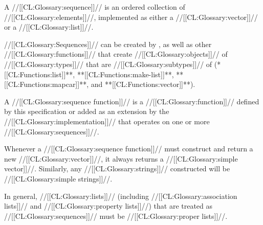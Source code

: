 

A //[[CL:Glossary:sequence]]// is an ordered collection of //[[CL:Glossary:elements]]//,
implemented as either a //[[CL:Glossary:vector]]// or a //[[CL:Glossary:list]]//.

//[[CL:Glossary:Sequences]]// can be created by ,
as well as other //[[CL:Glossary:functions]]// that create //[[CL:Glossary:objects]]// 
of //[[CL:Glossary:types]]// that are //[[CL:Glossary:subtypes]]// of  
(\eg **[[CL:Functions:list]]**, **[[CL:Functions:make-list]]**, **[[CL:Functions:mapcar]]**, and **[[CL:Functions:vector]]**).

A //[[CL:Glossary:sequence function]]// is a //[[CL:Glossary:function]]// 
   defined by this specification
or added as an extension by the //[[CL:Glossary:implementation]]// 
that operates on one or more //[[CL:Glossary:sequences]]//.

Whenever a //[[CL:Glossary:sequence function]]// must construct and return
a new //[[CL:Glossary:vector]]//, it always returns a //[[CL:Glossary:simple vector]]//.
Similarly, any //[[CL:Glossary:strings]]// constructed will be //[[CL:Glossary:simple strings]]//.



In general, //[[CL:Glossary:lists]]// (including //[[CL:Glossary:association lists]]// and //[[CL:Glossary:property lists]]//)
that are treated as //[[CL:Glossary:sequences]]// must be //[[CL:Glossary:proper lists]]//.

\endsubsection%

